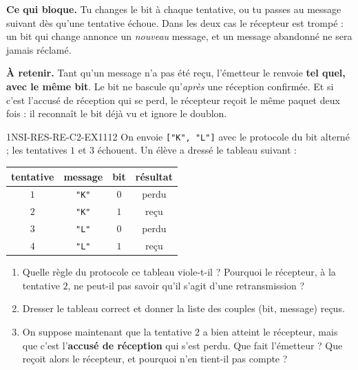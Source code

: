 

\textbf{Ce qui bloque.} Tu changes le bit à chaque tentative, ou tu passes au message
suivant dès qu'une tentative échoue. Dans les deux cas le récepteur est trompé : un bit qui
change annonce un \emph{nouveau} message, et un message abandonné ne sera jamais réclamé.

\textbf{À retenir.} Tant qu'un message n'a pas été reçu, l'émetteur le renvoie \textbf{tel
quel, avec le même bit}. Le bit ne bascule qu'\emph{après} une réception confirmée. Et si
c'est l'accusé de réception qui se perd, le récepteur reçoit le même paquet deux fois : il
reconnaît le bit déjà vu et ignore le doublon.

\begin{exercice}{1NSI-RES-RE-C2-EX1}{1}{12}
On envoie \lstinline{["K", "L"]} avec le protocole du bit alterné ; les tentatives $1$ et $3$
échouent. Un élève a dressé le tableau suivant :
\begin{center}
\begin{tabular}{cccc}
tentative & message & bit & résultat \\
\hline
$1$ & \texttt{"K"} & $0$ & perdu \\
$2$ & \texttt{"K"} & $1$ & reçu \\
$3$ & \texttt{"L"} & $0$ & perdu \\
$4$ & \texttt{"L"} & $1$ & reçu \\
\end{tabular}
\end{center}
\begin{enumerate}
  \item Quelle règle du protocole ce tableau viole-t-il ? Pourquoi le récepteur, à la
        tentative $2$, ne peut-il pas savoir qu'il s'agit d'une retransmission ?
  \item Dresser le tableau correct et donner la liste des couples (bit, message) reçus.
  \item On suppose maintenant que la tentative $2$ a bien atteint le récepteur, mais que
        c'est l'\textbf{accusé de réception} qui s'est perdu. Que fait l'émetteur ? Que
        reçoit alors le récepteur, et pourquoi n'en tient-il pas compte ?
\end{enumerate}
\end{exercice}

